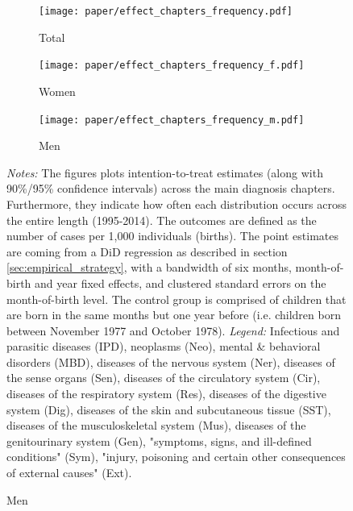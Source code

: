 \documentclass[11pt, a4paper]{article} %
\begin{document}
\begin{figure}[H]\centering
	\caption{Intention-to-treat effects across main chapters}\label{fig: lc_hospital2_gdr_DD}
	\begin{subfigure}[h]{0.48\linewidth}\centering\caption{Total}
		\texttt{[image: paper/effect\_chapters\_frequency.pdf]}
	\end{subfigure}
	
	
	\begin{subfigure}[h]{0.48\linewidth}\centering\caption{Women}
		\texttt{[image: paper/effect\_chapters\_frequency\_f.pdf]}
	\end{subfigure}
	\quad
	\begin{subfigure}[h]{0.48\linewidth}\centering\caption{Men}
		\texttt{[image: paper/effect\_chapters\_frequency\_m.pdf]}
	\end{subfigure}
	\scriptsize
	\begin{minipage}{\linewidth}
		\emph{Notes:} The figures plots intention-to-treat estimates (along with 90\%/95\% confidence intervals) across the main diagnosis chapters. Furthermore, they indicate how often each distribution occurs across the entire length (1995-2014). The outcomes are defined as the number of cases per 1,000 individuals (births). The point estimates are coming from a DiD regression as described in section \ref{sec:empirical_strategy}, with a bandwidth of six months, month-of-birth and year fixed effects, and clustered standard errors on the month-of-birth level. The control group is comprised of children	that are born in the same months but one year before (i.e. children born between November 1977 and October 1978). \newline
		\emph{Legend:} Infectious and parasitic diseases (IPD), neoplasms (Neo), mental \& behavioral disorders (MBD), diseases of the nervous system (Ner), diseases of the sense organs (Sen), diseases of the circulatory system (Cir), diseases of the respiratory system (Res), diseases of the digestive system (Dig), diseases of the skin and subcutaneous tissue (SST), diseases of the musculoskeletal system (Mus), diseases of the genitourinary system (Gen), "symptoms, signs, and ill-defined conditions" (Sym), "injury, poisoning and certain other consequences of external causes" (Ext).

	\end{minipage}
\end{figure}
\vspace*{\fill}\clearpage
\end{document}
